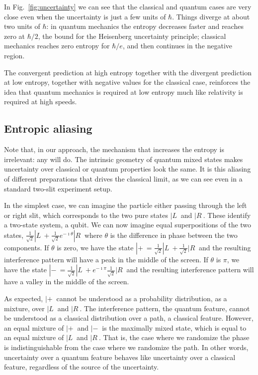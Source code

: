 \documentclass{SciPost}
\begin{document}
In Fig.~\ref{fig:uncertainty} we can see that the classical and quantum cases are very close even when the uncertainty is just a few units of $\hbar$. Things diverge at about two units of $\hbar$: in quantum mechanics the entropy decreases faster and reaches zero at $\hbar/2$, the bound for the Heisenberg uncertainty principle; classical mechanics reaches zero entropy for $\hbar/e$, and then continues in the negative region.

The convergent prediction at high entropy together with the divergent prediction at low entropy, together with negative values for the classical case, reinforces the idea that quantum mechanics is required at low entropy much like relativity is required at high speeds.

\subsection{Entropic aliasing}

Note that, in our approach, the mechanism that increases the entropy is irrelevant: any will do. The intrinsic geometry of quantum mixed states makes uncertainty over classical or quantum properties look the same. It is this aliasing of different preparations that drives the classical limit, as we can see even in a standard two-slit experiment setup. 

In the simplest case, we can imagine the particle either passing through the left or right slit, which corresponds to the two pure states $|L\>$ and $|R\>$. These identify a two-state system, a qubit. We can now imagine equal superpositions of the two states, $\frac{1}{\sqrt{2}}|L\> + \frac{1}{\sqrt{2}} e^{-\imath \theta} |R\>$ where $\theta$ is the difference in phase between the two components. If $\theta$ is zero, we have the state $|+\> = \frac{1}{\sqrt{2}}|L\> + \frac{1}{\sqrt{2}} |R\>$ and the resulting interference pattern will have a peak in the middle of the screen. If $\theta$ is $\pi$, we have the state $|-\> = \frac{1}{\sqrt{2}}|L\> + e^{-\imath \pi}\frac{1}{\sqrt{2}} |R\>$ and the resulting interference pattern will have a valley in the middle of the screen.

As expected, $|+\>$ cannot be understood as a probability distribution, as a mixture, over $|L\>$ and $|R\>$. The interference pattern, the quantum feature, cannot be understood as a classical distribution over a path, a classical feature. However, an equal mixture of $|+\>$ and $|-\>$ is the maximally mixed state, which is equal to an equal mixture of $|L\>$ and $|R\>$. That is, the case where we randomize the phase is indistinguishable from the case where we randomize the path. In other words, uncertainty over a quantum feature behaves like uncertainty over a classical feature, regardless of the source of the uncertainty.
\end{document}
